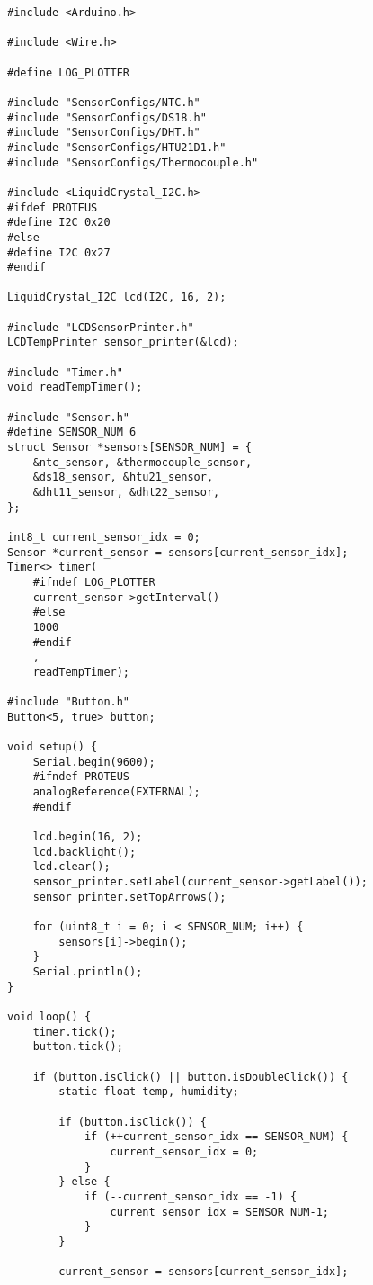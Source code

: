 \begin{lstlisting}[style=cpp-small, caption=Код основної частини програми, label=lst:program]
#include <Arduino.h>

#include <Wire.h>

#define LOG_PLOTTER

#include "SensorConfigs/NTC.h"
#include "SensorConfigs/DS18.h"
#include "SensorConfigs/DHT.h"
#include "SensorConfigs/HTU21D1.h"
#include "SensorConfigs/Thermocouple.h"

#include <LiquidCrystal_I2C.h>
#ifdef PROTEUS
#define I2C 0x20
#else
#define I2C 0x27
#endif

LiquidCrystal_I2C lcd(I2C, 16, 2);

#include "LCDSensorPrinter.h"
LCDTempPrinter sensor_printer(&lcd);

#include "Timer.h"
void readTempTimer();

#include "Sensor.h"
#define SENSOR_NUM 6
struct Sensor *sensors[SENSOR_NUM] = {
    &ntc_sensor, &thermocouple_sensor,
    &ds18_sensor, &htu21_sensor,
    &dht11_sensor, &dht22_sensor,
};

int8_t current_sensor_idx = 0;
Sensor *current_sensor = sensors[current_sensor_idx];
Timer<> timer(
    #ifndef LOG_PLOTTER
    current_sensor->getInterval()
    #else
    1000
    #endif
    ,
    readTempTimer);

#include "Button.h"
Button<5, true> button;

void setup() {
    Serial.begin(9600);
    #ifndef PROTEUS
    analogReference(EXTERNAL);
    #endif

    lcd.begin(16, 2);
    lcd.backlight();
    lcd.clear();
    sensor_printer.setLabel(current_sensor->getLabel());
    sensor_printer.setTopArrows();

    for (uint8_t i = 0; i < SENSOR_NUM; i++) {
        sensors[i]->begin();
    }
    Serial.println();
}

void loop() {
    timer.tick();
    button.tick();

    if (button.isClick() || button.isDoubleClick()) {
        static float temp, humidity;

        if (button.isClick()) {
            if (++current_sensor_idx == SENSOR_NUM) {
                current_sensor_idx = 0;
            }
        } else {
            if (--current_sensor_idx == -1) {
                current_sensor_idx = SENSOR_NUM-1;
            }
        }

        current_sensor = sensors[current_sensor_idx];


\end{lstlisting}
